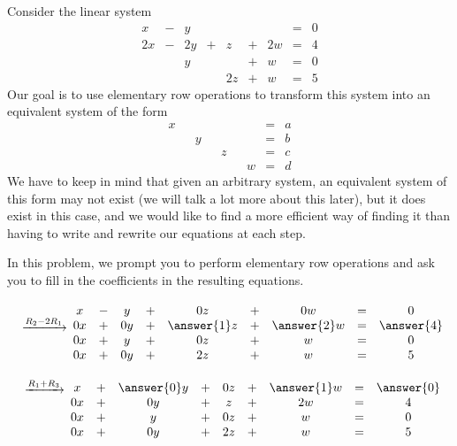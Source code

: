\documentclass{ximera}
\begin{document}
\begin{exploration}\label{init:augmentedmatrixex}
Consider the linear system
\begin{equation}\label{eq:sys20originalsystem1}
\begin{array}{ccccccccc}
      x &- &y&&&&&= &0 \\
	 2x& -&2y&+&z&+&2w&=&4\\
     & &y&&&+&w&=&0\\
     & &&&2z&+&w&=&5
    \end{array}
    \end{equation}
Our goal is to use elementary row operations to transform this system into an equivalent system of the form
\begin{equation}\begin{array}{ccccccccc}
      x & &&&&&&= &a \\
	 & &y&&&&&=&b\\
     & &&&z&&&=&c\\
     & &&&&&w&=&d
    \end{array}
    \end{equation}
 We have to keep in mind that given an arbitrary system, an equivalent system of this form may not exist (we will talk a lot more about this later), but it does exist in this case, and we would like to find a more efficient way of finding it than having to write and rewrite our equations at each step.   
 
In this problem, we prompt you to perform elementary row operations and ask you to fill in the coefficients in the resulting equations.
 
$$\begin{array}{c}
 \\
 \xrightarrow{R_2-2R_1}\\
\\
\\
 \end{array}
\begin{matrix}
      x &- &y&+&0z&+&0w&= &0 \\
	 0x& +&0y&+&\answer{1}z&+&\answer{2}w&=&\answer{4}\\
     0x& +&y&+&0z&+&w&=&0\\
     0x&+&0y&+&2z&+&w&=&5
    \end{matrix}$$
    
 $$
 \begin{array}{c}
 \xrightarrow{R_1+R_3}\\
 \\
\\
\\
 \end{array}
 \begin{matrix}
      x &+ &\answer{0}y&+&0z&+&\answer{1}w&= &\answer{0} \\
	 0x& +&0y&+&z&+&2w&=&4\\
     0x& +&y&+&0z&+&w&=&0\\
     0x&+&0y&+&2z&+&w&=&5
    \end{matrix}$$
 


\end{exploration}
\end{document}
